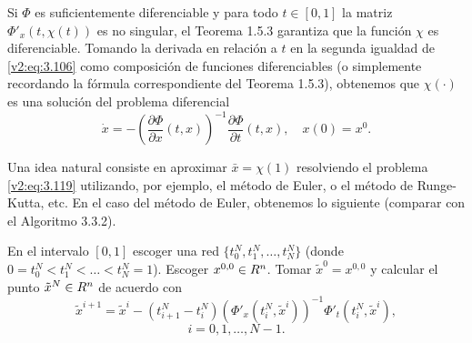 Si $\Phi$ es suficientemente diferenciable y para todo $t \in [0, 1]$ la matriz $\Phi'_x(t, \chi(t))$ es no singular, el Teorema 1.5.3 garantiza que la función $\chi$ es diferenciable. Tomando la derivada en relación a $t$ en la segunda igualdad de \eqref{v2:eq:3.106} como composición de funciones diferenciables (o simplemente recordando la fórmula correspondiente del Teorema 1.5.3), obtenemos que $\chi(\cdot)$ es una solución del problema diferencial
\begin{equation}
    \dot{x} = -\left( \frac{\partial \Phi}{\partial x}(t, x) \right)^{-1} \frac{\partial \Phi}{\partial t}(t, x), \quad x(0) = x^0.
    \label{v2:eq:3.119}
\end{equation}

Una idea natural consiste en aproximar $\bar{x} = \chi(1)$ resolviendo el problema \eqref{v2:eq:3.119} utilizando, por ejemplo, el método de Euler, o el método de Runge-Kutta, etc. En el caso del método de Euler, obtenemos lo siguiente (comparar con el Algoritmo 3.3.2).

\begin{algorithm}
    En el intervalo $[0, 1]$ escoger una red $\{t_0^N, t_1^N, \dots, t_N^N\}$ (donde $0 = t_0^N < t_1^N < \dots < t_N^N = 1$). Escoger $x^{0,0} \in R^n$. Tomar $\tilde{x}^0 = x^{0,0}$ y calcular el punto $\tilde{x}^N \in R^n$ de acuerdo con
\begin{equation}
    \tilde{x}^{i+1} = \tilde{x}^i - (t_{i+1}^N - t_i^N)(\Phi'_x(t_i^N, \tilde{x}^i))^{-1}\Phi'_t(t_i^N, \tilde{x}^i),
    \label{v2:eq:3.120}
\end{equation}
\[
    i = 0, 1, \dots, N-1.
\]
\end{algorithm}


